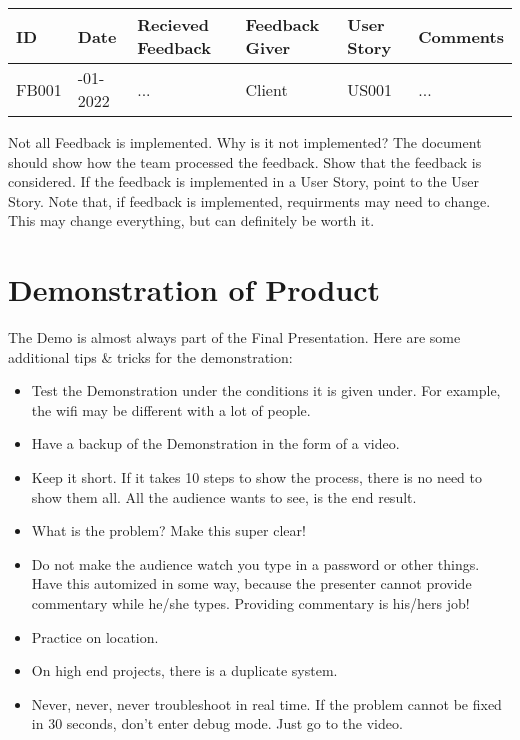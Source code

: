 \documentclass[10pt]{report}
\begin{document}
\medskip
\begin{tabularx}{0.8\textwidth} { 
  | >{\raggedright\arraybackslash}X 
  | >{\raggedright\arraybackslash}X 
  | >{\raggedright\arraybackslash}X 
  | >{\raggedright\arraybackslash}X 
  | >{\raggedright\arraybackslash}X 
  | >{\raggedright\arraybackslash}X | }
 \hline
 ID & Date & Recieved Feedback & Feedback Giver & User Story & Comments \\
 \hline
 FB001 & 01-01-2022 & ... & Client & US001 & ... \\
 \hline
\end{tabularx}
\medskip

Not all Feedback is implemented. Why is it not implemented? The document should show how the team processed the feedback. Show that the feedback is considered. If the feedback is implemented in a User Story, point to the User Story. Note that, if feedback is implemented, requirments may need to change. This may change everything, but can definitely be worth it.

\newpage

\section{Demonstration of Product}

The Demo is almost always part of the Final Presentation. Here are some additional tips \& tricks for the demonstration:

\begin{itemize}
	\item Test the Demonstration under the conditions it is given under. For example, the wifi may be different with a lot of people.
	\item Have a backup of the Demonstration in the form of a video.
	\item Keep it short. If it takes 10 steps to show the process, there is no need to show them all. All the audience wants to see, is the end result.
	\item What is the problem? Make this super clear!
	\item Do not make the audience watch you type in a password or other things. Have this automized in some way, because the presenter cannot provide commentary while he/she types. Providing commentary is his/hers job!
	\item Practice on location.
	\item On high end projects, there is a duplicate system.
	\item Never, never, never troubleshoot in real time. If the problem cannot be fixed in 30 seconds, don't enter debug mode. Just go to the video.
\end{itemize}
\end{document}
